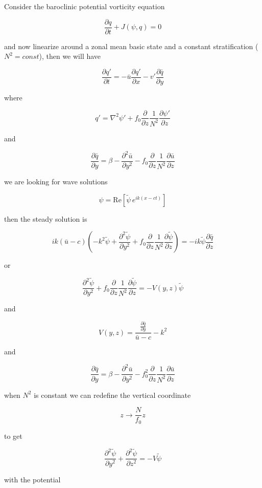 Consider the baroclinic potential vorticity equation

\[\frac{\partial q}{\partial t} +J(\psi, q) = 0\]

and now linearize around a zonal mean basic state and a constant
stratification (\(N^2 = const\)), then we will have

{\[\frac{\partial q'}{\partial t} = -\bar{u}\frac{\partial q'}{\partial x} - v'\frac{\partial \bar{q}}{\partial y}\]}

where

{\[q'= \nabla^2 \psi'+ f_0 \frac{\partial }{\partial z} \frac{1}{N^2} \frac{\partial \psi'}{\partial z}\]}

and

\[\frac{\partial \bar{q}}{\partial y} = \beta - \frac{\partial^{2} \bar{u}}{\partial y^{2}} -f_0 \frac{\partial }{\partial z} \frac{1}{N^2} \frac{\partial \bar{u}}{\partial z}\]

we are looking for wave solutions

\[\psi = \mathrm{Re}\left[ \tilde{\psi}\,e^{i k(x-ct)}\right]\]

then the steady solution is

\[ik(\bar{u}-c)\left(-k^2\tilde{\psi} +\frac{\partial^{2} \tilde{\psi}}{\partial y^{2}} + f_0 \frac{\partial }{\partial z} \frac{1}{N^2} \frac{\partial \tilde{\psi}}{\partial z}\right) = -ik\tilde{\psi}\frac{\partial \bar{q}}{\partial z}\]

or

\[\frac{\partial^{2} \tilde{\psi}}{\partial y^{2}}  + f_0 \frac{\partial }{\partial z} \frac{1}{N^2} \frac{\partial \tilde{\psi}}{\partial z} = -V(y,z)\tilde{\psi}\]

and

\[V(y,z) = \frac{\displaystyle\frac{\partial \bar{q}}{\partial y}}{\bar{u}-c} - k^2\]

and

\[\frac{\partial \bar{q}}{\partial y} = \beta -\frac{\partial^{2} \bar{u}}{\partial y^{2}} -f_0^2\frac{\partial }{\partial z}\frac{1}{N^2}\frac{\partial \bar{u}}{\partial z}\]

when \(N^2\) is constant we can redefine the vertical coordinate

\[z \to \frac{N }{f_0} z\]

to get

\[\frac{\partial^{2} \tilde{\psi}}{\partial y^{2}} + \frac{\partial^{2} \tilde{\psi}}{\partial z^{2}} = -V \tilde{\psi}\]

with the potential

